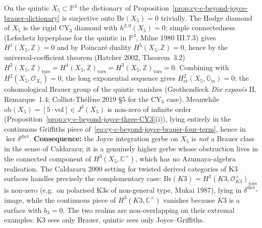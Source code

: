 \begin{remark}
\label{rem:cy-c-beyond-quintic-joyce-not-brauer}
On the quintic $X_5 \subset \mathbb{P}^4$ the dictionary of
Proposition~\ref{prop:cy-c-beyond-joyce-brauer-dictionary} is surjective
onto $\mathrm{Br}(X_5) = 0$ trivially. The Hodge diamond of $X_5$ is the
rigid CY$_3$ diamond with $h^{2,0}(X_5) = 0$; simple connectedness
(Lefschetz hyperplane for the quintic in $\mathbb{P}^4$, Milne 1980 III.7.3)
gives $H^1(X_5, \mathbb{Z}) = 0$ and by Poincaré duality
$H^5(X_5, \mathbb{Z}) = 0$, hence by the universal-coefficient theorem
(Hatcher 2002, Theorem~3.2)
$H^2(X_5, \mathbb{Z})_{\mathrm{tors}} = H^4(X_5, \mathbb{Z})_{\mathrm{tors}}
= H^3(X_5, \mathbb{Z})_{\mathrm{tors}} = 0$.
Combining with $H^2(X_5, \mathcal{O}_{X_5}) = 0$, the long exponential
sequence gives $H^2_{\mathrm{et}}(X_5, \mathbb{G}_m) = 0$: the cohomological
Brauer group of the quintic vanishes (Grothendieck \emph{Dix exposés} II,
Remarque~1.4; Colliot-Th\'el\`ene 2019 \S 5 for the CY$_3$ case).
Meanwhile $\mathrm{ob}(X_5) = [5 \cdot \mathrm{vol}] \in J^3(X_5)$ is
non-zero of infinite order
(Proposition~\ref{prop:cy-c-beyond-joyce-three-CY3}(i)), lying entirely
in the continuous Griffiths piece of~\eqref{eq:cy-c-beyond-joyce-brauer-four-term},
hence in $\ker \delta^{\mathrm{dict}}$. \textbf{Consequence:} the Joyce
integration gerbe on $X_5$ is \emph{not} a Brauer class in the sense
of Caldararu; it is a genuinely higher gerbe whose obstruction lives in
the connected component of $H^3(X_5, \mathbb{C}^\times)$, which has no
Azumaya-algebra realisation. The Caldararu 2000 setting for twisted
derived categories of K3 surfaces handles precisely the complementary
case: $\mathrm{Br}(K3) = H^2(K3, \mathcal{O}_{K3}^\times)_{\mathrm{tors}}$
is non-zero (e.g.\ on polarised K3s of non-general type, Mukai 1987),
lying in $\delta^{\mathrm{dict}}$-image, while the continuous piece of
$H^3(K3, \mathbb{C}^\times)$ vanishes because $K3$ is a surface with
$b_3 = 0$. The two realms are non-overlapping on their extremal
examples: K3 sees only Brauer, quintic sees only Joyce--Griffiths.
\end{remark}

